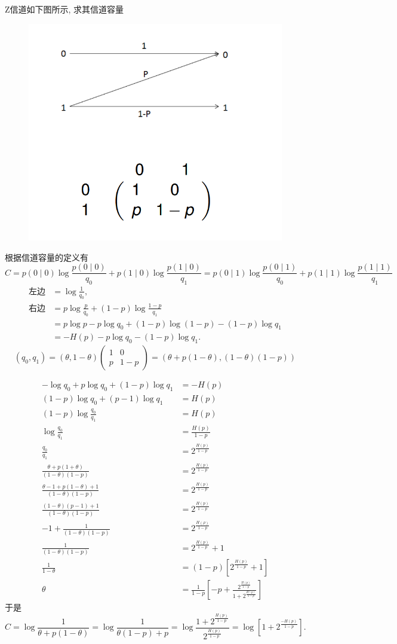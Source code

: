 \begin{exercise}
    Z信道如下图所示, 求其信道容量
    \begin{figure}[h]
        \centering
        \includegraphics[width=0.4\linewidth]{image/11.png}
    \end{figure}
    \end{exercise}
    \begin{solution}
    根据信道容量的定义有$$C=p(0 \mid 0) \log \frac{p(0 \mid 0)}{q_{0}}+p(1 \mid 0) \log \frac{p(1 \mid 0)}{q_{1}}=p(0 \mid 1) \log \frac{p(0 \mid 1)}{q_{0}}+p(1 \mid 1) \log \frac{p(1 \mid 1)}{q_{1}}$$
$$
\begin{aligned}
\text{左边}&=\log \frac{1}{q_{0}}, \\
\text{右边}&=p \log \frac{p}{q_{0}}+(1-p) \log \frac{1-p}{q_{1}} \\
&=p \log p-p \log q_{0}+(1-p) \log (1-p)-(1-p) \log q_{1} \\
&=-H(p)-p \log q_{0}-(1-p) \log q_{1} .
\end{aligned}
$$
$$\left(q_{0}, q_{1}\right)=(\theta, 1-\theta)\left(\begin{array}{cc}1 & 0 \\ p & 1-p\end{array}\right)=(\theta+p(1-\theta),(1-\theta)(1-p))$$


$$ \begin{aligned}-\log q_{0}+p \log q_{0}+(1-p) \log q_{1}&=-H(p) \\ (1-p) \log q_{0}+(p-1) \log q_{1}&=H(p) \\ (1-p) \log \frac{q_{0}}{q_{1}}&=H(p)\\\log \frac{q_{0}}{q_{1}}&=\frac{H(p)}{1-p} \\ \frac{q_{0}}{q_{1}}&=2^{\frac{H(p)}{1-p}} \\ \frac{\theta+p(1+\theta)}{(1-\theta)(1-p)}&=2^{\frac{H(p)}{1-p}} \\ \frac{\theta-1+p(1-\theta)+1}{(1-\theta)(1-p)}&=2^{\frac{H(p)}{1-p}} \\ \frac{(1-\theta)(p-1)+1}{(1-\theta)(1-p)}&=2^{\frac{H(p)}{1-p}}\\-1+\frac{1}{(1-\theta)(1-p)}&=2^{\frac{H(\rho)}{1-p}} \\ \frac{1}{(1-\theta)(1-p)}&=2^{\frac{H(p)}{1-p}}+1 \\ \frac{1}{1-\theta}&=(1-p)\left[2^{\frac{H(p)}{1-p}}+1\right] \\ \theta&=\frac{1}{1-p}\left[-p+\frac{2^{\frac{H(p)}{1-p}}}{1+2^{\frac{H(p)}{1-p}}}\right]\end{aligned} $$
于是
$$ C=\log \frac{1}{\theta+p(1-\theta)}  =\log \frac{1}{\theta(1-p)+p}  =\log \frac{1+2^{\frac{H(p)}{1-p}}}{2^{\frac{H(p)}{1-p}}}=\log \left[1+2^{\frac{-H(p)}{1-p}}\right] . $$
    \end{solution}

